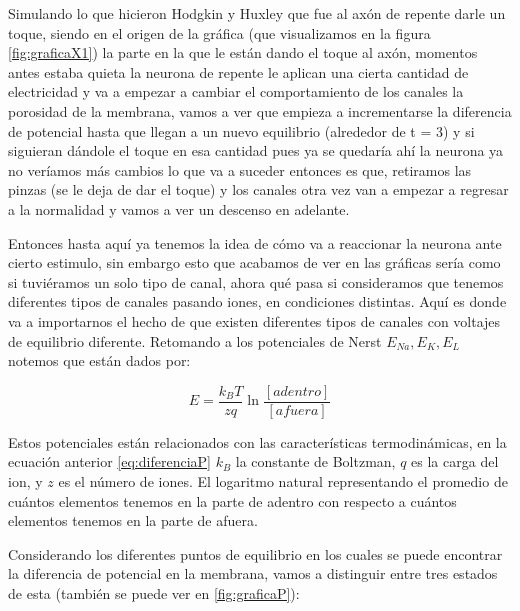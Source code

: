 Simulando lo que hicieron Hodgkin y Huxley que fue al axón de repente darle un toque, siendo en el origen de la gráfica (que visualizamos en la figura \ref{fig:graficaX1}) la parte en la que le están dando el toque al axón, momentos antes estaba quieta la neurona de repente le aplican una cierta cantidad de electricidad y va a empezar a cambiar el comportamiento de los canales la porosidad de la membrana, vamos a ver que empieza a incrementarse la diferencia de potencial hasta que llegan a un nuevo equilibrio (alrededor de t = 3) y si siguieran dándole el toque en esa cantidad pues ya se quedaría ahí la neurona ya no veríamos más cambios lo que va a suceder entonces es que, retiramos las pinzas (se le deja de dar el toque) y los canales otra vez van a empezar a regresar a la normalidad y vamos a ver un descenso en adelante.

Entonces hasta aquí ya tenemos la idea de cómo va a reaccionar la neurona ante cierto estimulo, sin embargo esto que acabamos de ver en las gráficas sería como si tuviéramos un solo tipo de canal, ahora qué pasa si consideramos que tenemos diferentes tipos de canales pasando iones, en condiciones distintas. 
Aquí es donde va a importarnos el hecho de que existen diferentes tipos de canales con voltajes de equilibrio diferente. 
Retomando a los potenciales de Nerst \(E_{Na},E_{K},E_{L}\) notemos que están dados por:

\begin{equation}
    E = \dfrac{k_{B}T}{zq}\ln\dfrac{[adentro]}{[afuera]}
 \label{eq:diferenciaP}
\end{equation}

Estos potenciales están relacionados con las características termodinámicas, en la ecuación anterior \ref{eq:diferenciaP} \(k_{B}\) la constante de Boltzman, \(q\) es la carga del ion, y \(z\) es el número de iones. El logaritmo natural representando el promedio de cuántos elementos tenemos en la parte de adentro con respecto a cuántos elementos tenemos en la parte de afuera.

Considerando los diferentes puntos de equilibrio en los cuales se puede encontrar la diferencia de potencial en la membrana, vamos a distinguir entre tres estados de esta (también se puede ver en \ref{fig:graficaP}):

